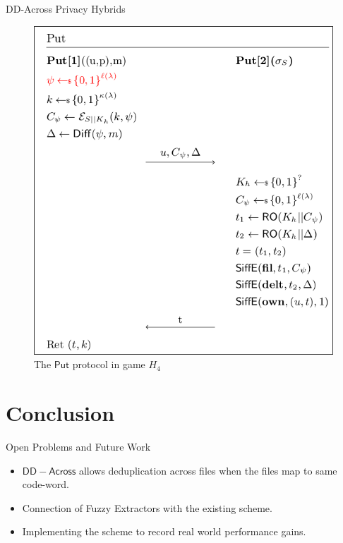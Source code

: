 \documentclass{beamer}
\newcommand{\scheme}{\mathsf{DD-Across}}
\begin{document}
\begin{frame}{DD-Across Privacy Hybrids}
    \begin{figure}[H]
      \centering
      \includegraphics[scale=0.3]{H4}
      \caption{The $\mathsf{Put}$ protocol in game $H_4$}
    \end{figure}
\end{frame}

%    
\section{Conclusion}
\begin{frame}{Open Problems and Future Work}
	\begin{itemize}
		\setlength\itemsep{1em}
		\item $\scheme$ allows deduplication across files when the files map to same code-word.
		\item Connection of Fuzzy Extractors with the existing scheme.
		\item Implementing the scheme to record real world performance gains.
	\end{itemize}
\end{frame}
\end{document}

